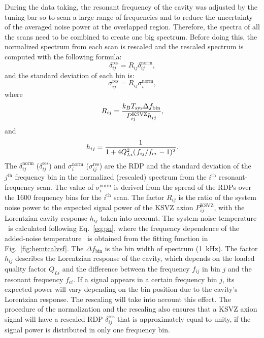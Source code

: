 During the data taking, the resonant frequency of the cavity was  
adjusted by the tuning bar so to scan a large range of frequencies and to 
reduce the uncertainty of the averaged noise power at the overlapped region. 
Therefore, the 
spectra of all the scans need to be combined to create one big spectrum. 
Before doing this, the normalized spectrum from each scan is rescaled and 
the rescaled spectrum is computed with the following formula:
\begin{equation}
  \label{eq:respower_eqn}
  \delta_{ij}^\text{res} = R_{ij}\delta_{ij}^\text{norm},
\end{equation}
and the standard deviation of each bin is:
\begin{equation}
  \label{eq:ressigma_eqn}
  \sigma_{ij}^\text{res} = R_{ij}\sigma_{i}^\text{norm},
\end{equation}
where 
 \begin{equation}
 R_{ij} = \frac{k_{B}T_\text{sys} \Delta f_\text{bin} }{P_{ij}^\text{KSVZ} h_{ij}}, 
 \label{eq:Rratio}
 \end{equation}
and 
 \begin{equation}
 h_{ij} = \frac{1}{1 + 4Q_{Li}^{2}(\left.f_{ij}\middle/f_{ci}\right.-1)^2}. 
 \label{eq:Lorentz}
 \end{equation}
The $\delta_{ij}^\text{norm}$ ($\delta_{ij}^\text{res}$) and 
$\sigma_{i}^\text{norm}$ ($\sigma_{ij}^\text{res}$) are the 
RDP and the standard deviation of the $j^\text{th}$ frequency bin in 
the normalized (rescaled) spectrum from the 
$i^\text{th}$ resonant-frequency scan. 
The value of $\sigma_{i}^\text{norm}$ is derived from the spread of the 
RDPs over the 1600 frequency bins for the $i^\text{th}$ scan. 
The factor $R_{ij}$ is the ratio of 
the system noise power to the expected signal power of the KSVZ axion 
$P_{ij}^\text{KSVZ}$, with the Lorentzian cavity response $h_{ij}$ 
taken into account. 
The system-noise temperature \tsys\ is calculated following Eq.~\eqref{eq:pn},
 where the frequency dependence of the added-noise temperature \ta\ is 
obtained from the fitting function in Fig.~\ref{fig:hemtcalvsf}. 
The $\Delta f_\text{bin}$ is the bin width of spectrum (1~kHz). 
The factor $h_{ij}$ describes the Lorentzian response of the cavity, 
which depends on the loaded quality factor $Q_{Li}$ and the 
difference between the frequency $f_{ij}$ in bin $j$ and the resonant 
frequency $f_{ci}$. 
%
If a signal appears in a certain frequency bin $j$, its expected power 
will vary depending on the bin position due to the cavity's 
Lorentzian response. The rescaling will take into account this effect. 
The procedure of the normalization and the rescaling also ensures that a 
KSVZ axion signal will have a rescaled RDP $\delta_{ij}^\text{res}$ 
that is approximately equal to unity, if the signal power is distributed 
in only one frequency bin. 

